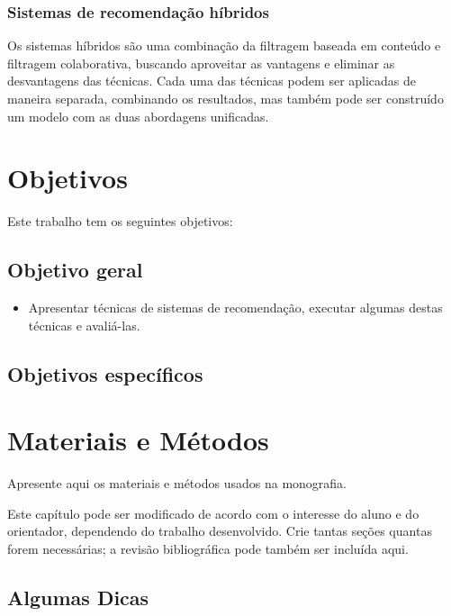 \documentclass[12pt,a4paper,header]{abnt}
\begin{document}
\subsection{Sistemas de recomendação híbridos}

Os sistemas híbridos são uma combinação da filtragem baseada em conteúdo e filtragem colaborativa, buscando aproveitar as vantagens e eliminar as desvantagens das técnicas\cite{shapira2011recommender}. Cada uma das técnicas podem ser aplicadas de maneira separada, combinando os resultados, mas também pode ser construído um modelo com as duas abordagens unificadas\cite{takahashi2015estudo}.

\chapter{Objetivos}

Este trabalho tem os seguintes objetivos:

\section{Objetivo geral}

\begin{itemize}

\item{Apresentar técnicas de sistemas de recomendação, executar algumas destas técnicas e avaliá-las.}

\end{itemize}

\section{Objetivos específicos}


\chapter{Materiais e Métodos}

Apresente aqui os materiais e métodos usados na monografia. 

Este capítulo pode ser modificado de acordo com o interesse do aluno e do orientador, dependendo do trabalho desenvolvido. Crie tantas seções quantas forem necessárias; a revisão bibliográfica pode também ser incluída aqui.


\section{Algumas Dicas}
\end{document}
